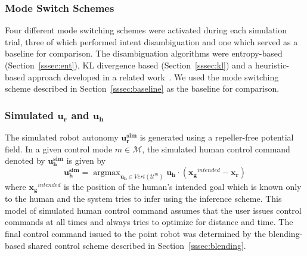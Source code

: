 \documentclass[conference]{IEEEtran}
\DeclareMathOperator*{\argmax}{argmax}
\begin{document}
\subsubsection{Mode Switch Schemes}
Four different mode switching schemes were activated during each simulation trial, three of which performed intent disambiguation and one which served as a baseline for comparison. The disambiguation algorithms were entropy-based (Section~\ref{sssec:ent}), KL divergence based (Section~\ref{sssec:kl}) and a heuristic-based approach developed in a related work~\citep{gopinath2017mode}. We used the mode switching scheme described in Section~\ref{sssec:baseline} as the baseline for comparison. 
\subsubsection{Simulated $\boldsymbol{u_r}$ and $\boldsymbol{u_h}$}
The simulated robot autonomy $\boldsymbol{u^{sim}_r}$ is generated using a repeller-free potential field. In a given control mode $m \in \mathcal{M}$, the simulated human control command denoted by $\boldsymbol{u^{sim}_h}$ is given by
\begin{equation*}
\boldsymbol{u^{sim}_h} = \argmax_{\boldsymbol{u_h} \in Vert(\mathcal{U}^m)} \boldsymbol{u_h}\cdot(\boldsymbol{x_g}^{intended} - \boldsymbol{x_r})
\end{equation*}
where $\boldsymbol{x_g}^{intended}$ is the position of the human's intended goal which is known only to the human and the system tries to infer using the inference scheme. This model of simulated human control command assumes that the user issues control commands at all times and always tries to optimize for distance and time. The final control command issued to the point robot was determined by the blending-based shared control scheme described in Section~\ref{sssec:blending}.
\end{document}
